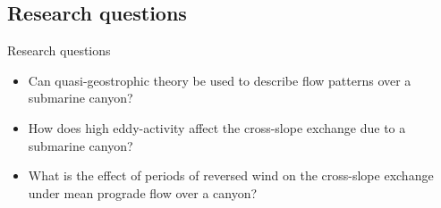 \documentclass{beamer}
\begin{document}

\subsection{Research questions}

\begin{frame}{Research questions}
    \begin{itemize}
    \item Can quasi-geostrophic theory be used to describe flow patterns over a submarine canyon?
    \item How does high eddy-activity affect the cross-slope exchange due to a submarine canyon?
    \item What is the effect of periods of reversed wind on the cross-slope exchange under mean prograde flow over a canyon? 
\end{itemize}

\end{frame}


\end{document}
